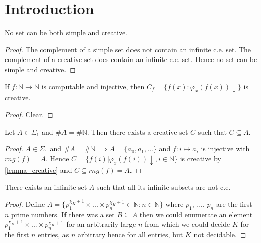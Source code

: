 \chapter{Introduction}

\begin{proposition}
No set can be both simple and creative.
\end{proposition}

\begin{proof}
The complement of a simple set does not contain an infinite c.e. set. The complement of a creative set does contain an infinite c.e. set. Hence no set can be simple and creative.
\end{proof}

\begin{lemma}\label{lemma_creative}
If $f : \mathbb{N} \to \mathbb{N}$ is computable and injective, then $C_f = \{f(x) : \varphi_x(f(x))\downarrow \}$ is creative.
\end{lemma}
\begin{proof}
Clear.
\end{proof}

\begin{proposition}
Let $A \in \Sigma_1$ and $\#A = \#\mathbb{N}$. Then there exists a creative set $C$ such that $C \subseteq A$.
\end{proposition}

\begin{proof}
$A \in \Sigma_1$ and $\#A = \#\mathbb{N} \implies A=\{a_0, a_1, ... \}$ and $f:i \mapsto a_i$ is injective with $rng(f)=A$. 
Hence $C=\{f(i) | \varphi_x(f(i))\downarrow, i \in \mathbb{N}\}$ is creative by \autoref{lemma_creative} and $C \subseteq	 rng(f) = A$.
\end{proof}

\begin{lemma}
There exists an infinite set $A$ such that all its infinite subsets are not c.e.
\end{lemma}
\begin{proof}
Define $A=\{p_1^{\chi_K+1}\times...\times p_n^{\chi_K+1} \in \mathbb{N} : n \in \mathbb{N}\}$ where $p_1$, ..., $p_n$ are the first $n$ prime numbers.
If there was a set $B \subseteq A$ then we could enumerate an element $p_1^{\chi_K+1}\times...\times p_n^{\chi_K+1}$ for an arbitrarily large $n$ from which we could decide $K$ for the first $n$ entries, as $n$ arbitrary hence for all entries, but $K$ not decidable.
\end{proof}




